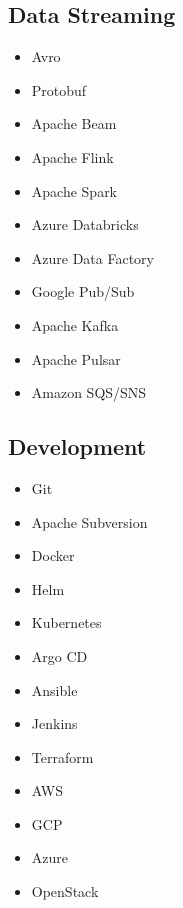 \documentclass[letterpaper]{resume}
\begin{document}
\begin{minipage}[t]{0.22\columnwidth}
\sectionspace

\subsection{Data Streaming}
\vspace{2pt}
\begin{itemize}
\item Avro
\item Protobuf
\item Apache Beam
\item Apache Flink
\item Apache Spark
\item Azure Databricks
\item Azure Data Factory
\item Google Pub/Sub
\item Apache Kafka
\item Apache Pulsar
\item Amazon SQS/SNS
\end{itemize}

\sectionspace

\subsection{Development}
\vspace{2pt}
\begin{itemize}
\item Git
\item Apache Subversion
\item Docker
\item Helm
\item Kubernetes
\item Argo CD
\item Ansible
\item Jenkins
\item Terraform
\item AWS
\item GCP
\item Azure
\item OpenStack
\end{itemize}

\sectionspace

\end{minipage}
\hfill
\end{document}

